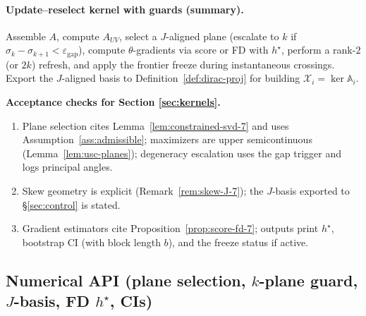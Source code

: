 \documentclass[10pt]{article}
\begin{document}
\paragraph{Update--reselect kernel with guards (summary).}
Assemble $A$, compute $A_{UV}$, select a $J$-aligned plane (escalate to $k$ if $\sigma_k-\sigma_{k+1}<\varepsilon_{\mathrm{gap}}$), compute $\theta$-gradients via score or FD with $h^\star$, perform a rank-$2$ (or $2k$) refresh, and apply the frontier freeze during instantaneous crossings. Export the $J$-aligned basis to Definition~\ref{def:dirac-proj} for building $\mathcal X_i=\ker\mathbb A_i$.

\begin{mdframed}
\textbf{Acceptance checks for Section \ref{sec:kernels}.}
\begin{enumerate}[leftmargin=*]
\item Plane selection cites Lemma~\ref{lem:constrained-svd-7} and uses Assumption~\ref{ass:admissible}; maximizers are upper semicontinuous (Lemma~\ref{lem:usc-planes}); degeneracy escalation uses the gap trigger and logs principal angles.
\item Skew geometry is explicit (Remark~\ref{rem:skew-J-7}); the $J$-basis exported to §\ref{sec:control} is stated.
\item Gradient estimators cite Proposition~\ref{prop:score-fd-7}; outputs print $h^\star$, bootstrap CI (with block length $b$), and the freeze status if active.
\end{enumerate}
\end{mdframed}

\subsection*{Numerical API (plane selection, $k$-plane guard, $J$-basis, FD $h^\star$, CIs)}
\end{document}
